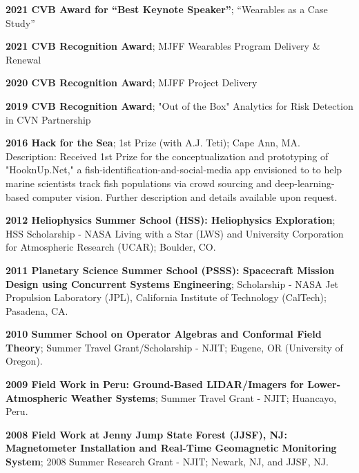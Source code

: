   \begin{itemize*}
    \item \textbf{2021 CVB Award for ``Best Keynote Speaker''};
      ``Wearables as a Case Study''
    \item \textbf{2021 CVB Recognition Award}; MJFF Wearables
      Program Delivery \& Renewal 
    \item \textbf{2020 CVB Recognition Award}; MJFF Project Delivery
    \item \textbf{2019 CVB Recognition Award}; "Out of the Box" Analytics for Risk Detection in CVN Partnership
    \item \textbf{2016 Hack for the Sea}; 1st Prize (with A.J. Teti); Cape Ann, MA. \\
      Description:
      Received 1st Prize for the conceptualization and prototyping 
      of "HooknUp.Net," a fish-identification-and-social-media app
      envisioned to to help marine scientists track fish populations
      via crowd sourcing and deep-learning-based computer vision.
      Further description and details available upon request.
    \item \textbf{2012 Heliophysics Summer School (HSS): Heliophysics Exploration};  
      HSS Scholarship - NASA Living with a Star (LWS) and
      University Corporation for Atmospheric Research (UCAR); Boulder, CO.
    \item \textbf{2011 Planetary Science Summer School (PSSS): Spacecraft Mission Design using Concurrent Systems Engineering}; 
      Scholarship - NASA Jet Propulsion Laboratory (JPL),  California Institute of 
      Technology (CalTech); Pasadena, CA.
    \item \textbf{2010 Summer School on Operator Algebras and Conformal Field Theory};
      Summer Travel Grant/Scholarship - NJIT; Eugene, OR (University of Oregon).
    \item \textbf{2009 Field Work in Peru: Ground-Based LIDAR/Imagers for Lower-Atmospheric Weather Systems}; 
      Summer Travel Grant -  NJIT; Huancayo, Peru.
    \item \textbf{2008 Field Work at Jenny Jump State Forest (JJSF), NJ: Magnetometer Installation and Real-Time Geomagnetic Monitoring System}; 
      2008 Summer Research Grant -  NJIT; Newark, NJ, and JJSF, NJ.
  \end{itemize*}



